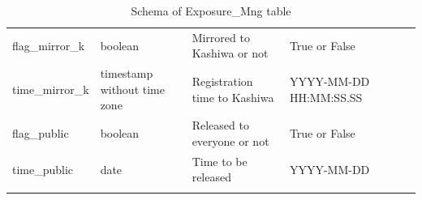 \documentclass[12pt]{article}
\begin{document}
\begin{table}[thbp]
\begin{center}
{\begin{tabular}{llllll}
flag\_mirror\_k & boolean & Mirrored to Kashiwa or not                               & True or False             &                  &             \\
time\_mirror\_k & timestamp without time zone & Registration time to Kashiwa                             & YYYY-MM-DD HH:MM:SS.SS    &                  &             \\
flag\_public & boolean & Released to everyone or not                              & True or False             &                  &             \\
time\_public & date & Time to be released                                      & YYYY-MM-DD                &                  &             \\
\hline\\
\end{tabular}
}
\caption{Schema of Exposure\_Mng table}
\end{center}
\end{table}
\end{document}
